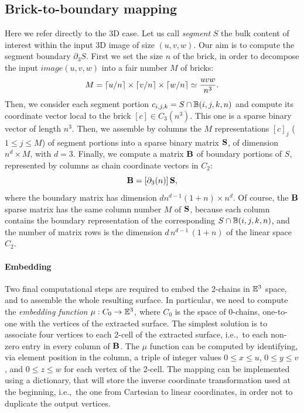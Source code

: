 \subsection{Brick-to-boundary mapping}\label{sec:brick-mapping}

Here we refer directly to the 3D case.
Let us call \emph{segment} $S$ the bulk content of interest within the input 3D image of size $(u,v,w)$. Our aim is to compute the segment boundary $\partial_3 S$. 
First we set the size $n$ of the brick, in order to decompose the input $image(u,v,w)$ into a fair number  $M$ of bricks:
\[
M = \left\lceil u/n \right\rceil \times \left\lceil v/n \right\rceil \times \left\lceil w/n \right\rceil \simeq \frac{uvw}{n^3}.
\] 
Then, we consider each segment portion $c_{i,j,k} = S \cap \mathbb{B}(i,j,k,n)$ and compute its coordinate vector local to the brick $[c]\in C_3(n^3)$. This one is a sparse binary vector of length $n^3$. Then, we assemble by columns the $M$ representations $[c]_j$ ($1\leq j\leq M$) of segment portions into a sparse binary matrix ${\bf S}$, of dimension $n^d \times M$, with $d=3$. Finally, we compute a matrix ${\bf \textbf{B}}$ of boundary portions of $S$, represented by columns as chain coordinate vectors in $C_2$:
\[
{\bf \textbf{B}} = [\partial_3(n)]\, {\bf S},
\]
where the boundary matrix has dimension $dn^{d-1}(1+n) \times n^d$.
Of course, the ${\bf \textbf{B}}$ sparse matrix has the same column number $M$ of ${\bf S}$, because each column contains the boundary representation of the corresponding $S \cap \mathbb{B}(i,j,k,n)$, and the number of matrix rows is the dimension $d\,n^{d-1}\,(1+n)$ of the linear space $C_2$.

\paragraph{Embedding}
Two final computational steps are required to embed the 2-chains in $\mathbb{E}^3$ space, and to assemble the whole resulting surface. In particular, we need to compute the \emph{embedding function} $\mu : C_0 \to \mathbb{E}^3$, where $C_0$ is the space of 0-chains, one-to-one with the vertices of the extracted surface. The simplest solution is to associate  four vertices to each 2-cell of the extracted surface, i.e.,~to each non-zero entry in every column of ${\bf \textbf{B}}$.  The $\mu$ function  can be computed by identifying, via  element position in the column, a triple of integer values $0\leq x\leq u$, $0\leq y\leq v$, and $0\leq z\leq w$ for each vertex of the 2-cell.  The mapping can be implemented using a dictionary, that will store the inverse coordinate transformation used at the beginning, i.e.,~the one from Cartesian to linear coordinates, in order not to duplicate the output vertices.   

